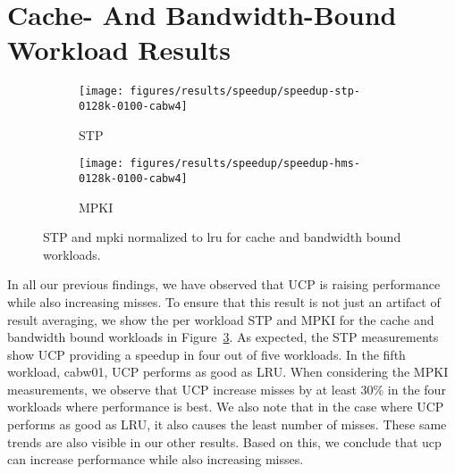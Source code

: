 \section{Cache- And Bandwidth-Bound Workload Results}
\begin{figure}[th]
    \centering
    \begin{subfigure}[b]{0.5\textwidth}
        \texttt{[image: figures/results/speedup/speedup-stp-0128k-0100-cabw4]}
        \caption{STP}
        \label{fig:results:base:cabw:stp}
    \end{subfigure}%
    \begin{subfigure}[b]{0.5\textwidth}
        \texttt{[image: figures/results/speedup/speedup-hms-0128k-0100-cabw4]}
        \caption{MPKI}
        \label{fig:results:base:cabw:mpki}
    \end{subfigure}
    \caption[cabw workloads result]{STP and \gls{mpki} normalized to \gls{lru} for cache and bandwidth bound workloads.}
    \label{fig:results:base:cabw} 
\end{figure}

In all our previous findings, we have observed that UCP is raising performance while also increasing misses.
To ensure that this result is not just an artifact of result averaging, we show the per workload STP and MPKI for the cache and bandwidth bound workloads in Figure~\ref{fig:results:base:cabw}.
As expected, the STP measurements show UCP providing a speedup in four out of five workloads.
In the fifth workload, cabw01, UCP performs as good as LRU.
When considering the MPKI measurements, we observe that UCP increase misses by at least 30\% in the four workloads where performance is best.
We also note that in the case where UCP performs as good as LRU, it also causes the least number of misses.
These same trends are also visible in our other results.
Based on this, we conclude that \gls{ucp} can increase performance while also increasing misses.